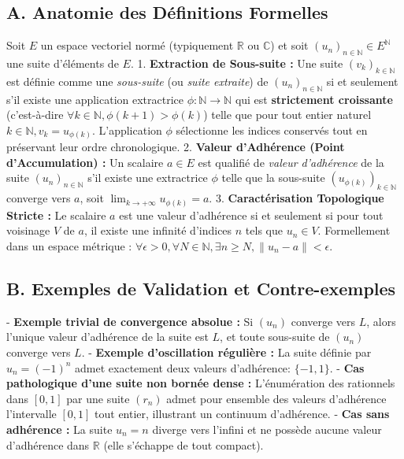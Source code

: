 \documentclass{report}
\begin{document}
\subsection*{A. Anatomie des Définitions Formelles}
Soit $E$ un espace vectoriel normé (typiquement $\mathbb{R}$ ou $\mathbb{C}$) et soit $(u_n)_{n \in \mathbb{N}} \in E^{\mathbb{N}}$ une suite d'éléments de $E$.
1. \textbf{Extraction de Sous-suite :} Une suite $(v_k)_{k \in \mathbb{N}}$ est définie comme une \textit{sous-suite} (ou \textit{suite extraite}) de $(u_n)_{n \in \mathbb{N}}$ si et seulement s'il existe une application extractrice $\phi : \mathbb{N} \to \mathbb{N}$ qui est \textbf{strictement croissante} (c'est-à-dire $\forall k \in \mathbb{N}, \phi(k+1) > \phi(k)$) telle que pour tout entier naturel $k \in \mathbb{N}, v_k = u_{\phi(k)}$. L'application $\phi$ sélectionne les indices conservés tout en préservant leur ordre chronologique.
2. \textbf{Valeur d'Adhérence (Point d'Accumulation) :} Un scalaire $a \in E$ est qualifié de \textit{valeur d'adhérence} de la suite $(u_n)_{n \in \mathbb{N}}$ s'il existe une extractrice $\phi$ telle que la sous-suite $(u_{\phi(k)})_{k \in \mathbb{N}}$ converge vers $a$, soit $\lim_{k \to +\infty} u_{\phi(k)} = a$.
3. \textbf{Caractérisation Topologique Stricte :} Le scalaire $a$ est une valeur d'adhérence si et seulement si pour tout voisinage $V$ de $a$, il existe une infinité d'indices $n$ tels que $u_n \in V$. Formellement dans un espace métrique : $\forall \epsilon > 0, \forall N \in \mathbb{N}, \exists n \ge N, \|u_n - a\| < \epsilon$.

\subsection*{B. Exemples de Validation et Contre-exemples}
- \textbf{Exemple trivial de convergence absolue :} Si $(u_n)$ converge vers $L$, alors l'unique valeur d'adhérence de la suite est $L$, et toute sous-suite de $(u_n)$ converge vers $L$.
- \textbf{Exemple d'oscillation régulière :} La suite définie par $u_n = (-1)^n$ admet exactement deux valeurs d'adhérence: $\{-1, 1\}$.
- \textbf{Cas pathologique d'une suite non bornée dense :} L'énumération des rationnels dans $[0, 1]$ par une suite $(r_n)$ admet pour ensemble des valeurs d'adhérence l'intervalle $[0, 1]$ tout entier, illustrant un continuum d'adhérence.
- \textbf{Cas sans adhérence :} La suite $u_n = n$ diverge vers l'infini et ne possède aucune valeur d'adhérence dans $\mathbb{R}$ (elle s'échappe de tout compact).
\end{document}
